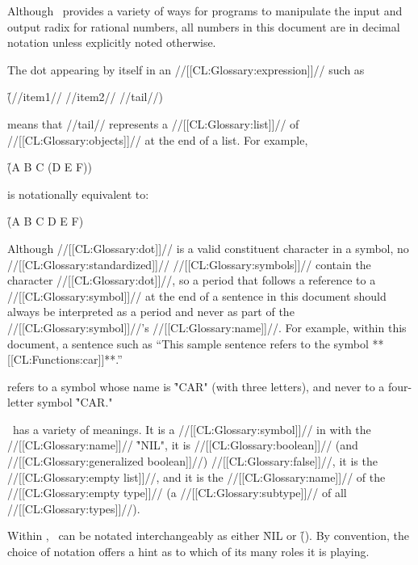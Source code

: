 Although \clisp\ provides a variety of ways for programs to manipulate the
input and output radix for rational numbers, all numbers in this document
are in decimal notation unless explicitly noted otherwise.

\endsubsubsubsection%



The dot appearing by itself in an //[[CL:Glossary:expression]]// such as

\f{(//item1// //item2// {\dot} //tail//)}

means that //tail// represents a //[[CL:Glossary:list]]// of //[[CL:Glossary:objects]]// 
at the end of a list.  For example,

\f{(A B C {\dot} (D E F))}

is notationally equivalent to:

\f{(A B C D E F)}

Although //[[CL:Glossary:dot]]// is a valid constituent character in a symbol, no 
//[[CL:Glossary:standardized]]// //[[CL:Glossary:symbols]]// contain the character //[[CL:Glossary:dot]]//,
so a period that follows a reference to a //[[CL:Glossary:symbol]]// at the end of
a sentence in this document should always be interpreted as a period
and never as part of the //[[CL:Glossary:symbol]]//'s //[[CL:Glossary:name]]//.
For example, within this document, a sentence such as
 ``This sample sentence refers to the symbol **[[CL:Functions:car]]**.'' 




refers to a symbol whose name is \f{"CAR"} (with three letters),
and never to a four-letter symbol \f{"CAR."}

\endsubsubsubsection%

\idxterm{()}

\nil\ has a variety of meanings.
It is a //[[CL:Glossary:symbol]]// in  with the //[[CL:Glossary:name]]// \f{"NIL"},
it is //[[CL:Glossary:boolean]]// (and //[[CL:Glossary:generalized boolean]]//) //[[CL:Glossary:false]]//,
it is the //[[CL:Glossary:empty list]]//,
and it is the //[[CL:Glossary:name]]// of the //[[CL:Glossary:empty type]]// (a //[[CL:Glossary:subtype]]// of all //[[CL:Glossary:types]]//).

Within \clisp, \nil\ can be notated interchangeably as either \f{NIL} or \f{()}.
By convention, the choice of notation offers a hint as to which of its many
roles it is playing.

